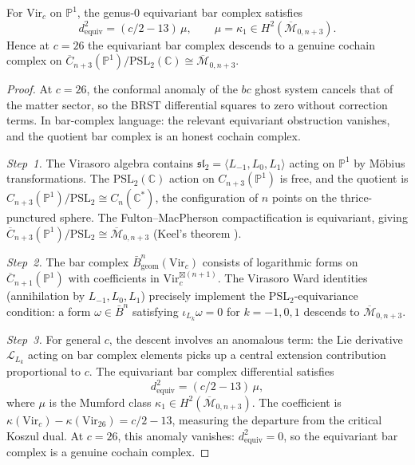 \begin{theorem}[Critical Virasoro descent at $c = 26$; \ClaimStatusProvedHere]\label{thm:virasoro-moduli}
For $\text{Vir}_c$ on $\mathbb{P}^1$, the genus-$0$ equivariant bar
complex satisfies
\[
d_{\mathrm{equiv}}^2 = (c/2 - 13)\,\mu,
\qquad
\mu = \kappa_1 \in H^2(\overline{\mathcal{M}}_{0,n+3}).
\]
Hence at $c = 26$ the equivariant bar complex descends to a genuine
cochain complex on
$\overline{C}_{n+3}(\mathbb{P}^1)/\mathrm{PSL}_2(\mathbb{C})
\cong \overline{\mathcal{M}}_{0,n+3}$.
\end{theorem}

\begin{proof}
At $c = 26$, the conformal anomaly of the
$bc$ ghost system cancels that of the matter sector, so the BRST
differential squares to zero without correction terms. In bar-complex
language: the relevant equivariant obstruction vanishes, and the
quotient bar complex is an honest cochain complex.

\emph{Step~1.}
The Virasoro algebra contains $\mathfrak{sl}_2 = \langle L_{-1}, L_0, L_1 \rangle$ acting on $\mathbb{P}^1$ by Möbius transformations. The $\mathrm{PSL}_2(\mathbb{C})$ action on $C_{n+3}(\mathbb{P}^1)$ is free, and the quotient is $C_{n+3}(\mathbb{P}^1)/\mathrm{PSL}_2 \cong C_n(\mathbb{C}^*)$, the configuration of $n$ points on the thrice-punctured sphere. The Fulton--MacPherson compactification is equivariant, giving $\overline{C}_{n+3}(\mathbb{P}^1)/\mathrm{PSL}_2 \cong \overline{\mathcal{M}}_{0,n+3}$ (Keel's theorem \cite{Kee92}).

\emph{Step~2.}
The bar complex $\bar{B}^n_{\mathrm{geom}}(\mathrm{Vir}_c)$ consists of logarithmic forms on $\overline{C}_{n+1}(\mathbb{P}^1)$ with coefficients in $\mathrm{Vir}_c^{\boxtimes(n+1)}$. The Virasoro Ward identities (annihilation by $L_{-1}, L_0, L_1$) precisely implement the $\mathrm{PSL}_2$-equivariance condition: a form $\omega \in \bar{B}^n$ satisfying $\iota_{L_k}\omega = 0$ for $k = -1, 0, 1$ descends to $\overline{\mathcal{M}}_{0,n+3}$.

\emph{Step~3.}
For general $c$, the descent involves an anomalous term: the Lie
derivative $\mathcal{L}_{L_k}$ acting on bar complex elements picks up
a central extension contribution proportional to $c$. The equivariant
bar complex differential satisfies
\[
d_{\mathrm{equiv}}^2=(c/2-13)\,\mu,
\]
where $\mu$ is the Mumford class
$\kappa_1 \in H^2(\overline{\mathcal{M}}_{0,n+3})$. The coefficient is
$\kappa(\mathrm{Vir}_c)-\kappa(\mathrm{Vir}_{26})=c/2-13$, measuring
the departure from the critical Koszul dual. At $c=26$, this anomaly
vanishes: $d_{\mathrm{equiv}}^2=0$, so the equivariant bar complex is a
genuine cochain complex.
\end{proof}

